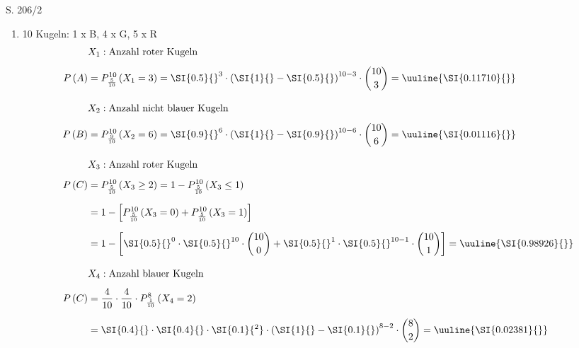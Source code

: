 \begin{Exercise}{S. 206/2}{}
\begin{enumerate}[leftmargin=*]
    \item [2.]{
        10 Kugeln: 1 x B, 4 x G, 5 x R\\[-2.0ex]
        \begin{align*}
            &X_{1}: \text{Anzahl roter Kugeln}\\[1.0ex]
            P\left(A\right) &= P_{\frac{5}{10}}^{10}\left(X_{1} = 3\right) = \SI{0.5}{}^{3} \cdot \left(\SI{1}{} - \SI{0.5}{}\right)^{10-3} \cdot \binom{10}{3} = \uuline{\SI{0.11710}{}}\\[2.0ex]
            &X_{2}: \text{Anzahl nicht blauer Kugeln}\\[1.0ex]
            P\left(B\right) &= P_{\frac{9}{10}}^{10}\left(X_{2} = 6\right) = \SI{0.9}{}^{6} \cdot \left(\SI{1}{} - \SI{0.9}{}\right)^{10-6} \cdot \binom{10}{6} = \uuline{\SI{0.01116}{}}\\[2.0ex]
            &X_{3}: \text{Anzahl roter Kugeln}\\[1.0ex]
            P\left(C\right) &= P_{\frac{5}{10}}^{10}\left(X_{3} \geq 2\right) = 1 - P_{\frac{5}{10}}^{10}\left(X_{3} \leq 1\right)\\[1.5ex]
            &= 1 - \left[P_{\frac{5}{10}}^{10}\left(X_{3} = 0\right) + P_{\frac{5}{10}}^{10}\left(X_{3} = 1\right)\right]\\[1.5ex]
            &= 1 - \left[\SI{0.5}{}^{0} \cdot \SI{0.5}{}^{10} \cdot \binom{10}{0} + \SI{0.5}{}^{1} \cdot \SI{0.5}{}^{10-1} \cdot \binom{10}{1}\right] = \uuline{\SI{0.98926}{}}\\[2.0ex]
            &X_{4}: \text{Anzahl blauer Kugeln}\\[1.0ex]
            P\left(C\right) &= \dfrac{4}{10} \cdot \dfrac{4}{10} \cdot P_{\frac{1}{10}}^{8}\left(X_{4} = 2\right)\\[1.5ex]
            &= \SI{0.4}{} \cdot \SI{0.4}{} \cdot \SI{0.1}{^2} \cdot \left(\SI{1}{} - \SI{0.1}{}\right)^{8-2} \cdot \binom{8}{2} = \uuline{\SI{0.02381}{}}
        \end{align*}
    }
\end{enumerate}
\end{Exercise}

